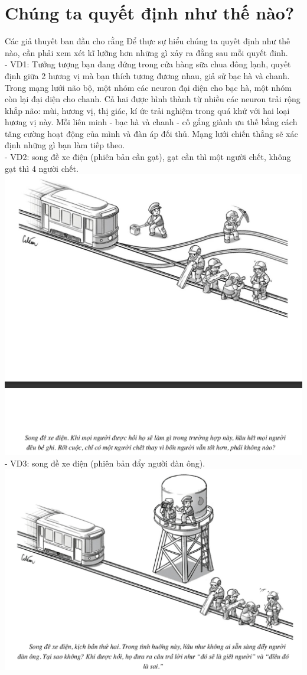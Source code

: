 \documentclass{article}
\newcommand\tab[1][1cm]{\hspace*{#1}}
\begin{document}
\section{Chúng ta quyết định như thế nào?}
\tab Các giả thuyết ban đầu cho rằng Để thực sự hiểu chúng ta quyết định như thế nào, cần phải xem xét kĩ lưỡng hơn những gì xảy ra đằng sau 
mỗi quyết đinh. \\
\tab - VD1: Tưởng tượng bạn đang đứng trong cửa hàng sữa chua đông lạnh, quyết định giữa 2 hương vị mà bạn
thích tương đương nhau, giả sử bạc hà và chanh. Trong mạng lưới não bộ, một nhóm các neuron đại diện cho bạc
hà, một nhóm còn lại đại diện cho chanh. Cả hai được hình thành từ nhiều các neuron trải rộng khắp não: mùi, 
hương vị, thị giác, kí ức trải nghiệm trong quá khứ với hai loại hương vị này. Mỗi liên minh - bạc hà và chanh -
cố gắng giành ưu thế bằng cách tăng cường hoạt động của mình và đàn áp đối thủ. Mạng lưới chiến thắng sẽ xác 
định những gì bạn làm tiếp theo.\\
\tab - VD2: song đề xe điện (phiên bản cần gạt), gạt cần thì một người chết, không gạt thì 4 người chết.\\
\includegraphics[width=\textwidth]{images/songdexedienver1.png}
\tab - VD3: song đề xe điện (phiên bản đẩy người đàn ông).\\
\includegraphics[width=\textwidth]{images/songdexedienver2.png}
\end{document}
